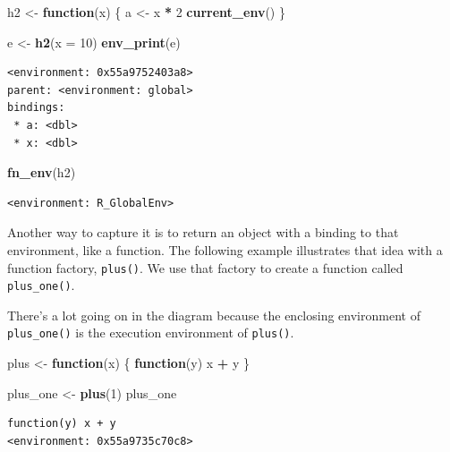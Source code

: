 \documentclass[]{book}
\newenvironment{Shaded}{\begin{snugshade}}{\end{snugshade}}
\newcommand{\ControlFlowTok}[1]{\textcolor[rgb]{0.13,0.29,0.53}{\textbf{#1}}}
\newcommand{\DataTypeTok}[1]{\textcolor[rgb]{0.13,0.29,0.53}{#1}}
\newcommand{\DecValTok}[1]{\textcolor[rgb]{0.00,0.00,0.81}{#1}}
\newcommand{\KeywordTok}[1]{\textcolor[rgb]{0.13,0.29,0.53}{\textbf{#1}}}
\newcommand{\NormalTok}[1]{#1}
\newcommand{\OperatorTok}[1]{\textcolor[rgb]{0.81,0.36,0.00}{\textbf{#1}}}
\newcommand{\StringTok}[1]{\textcolor[rgb]{0.31,0.60,0.02}{#1}}
\theoremstyle{definition}
\theoremstyle{definition}
\theoremstyle{definition}
\theoremstyle{remark}
\begin{document}
\begin{Shaded}
\begin{Highlighting}[]
\NormalTok{h2 <-}\StringTok{ }\ControlFlowTok{function}\NormalTok{(x) \{}
\NormalTok{  a <-}\StringTok{ }\NormalTok{x }\OperatorTok{*}\StringTok{ }\DecValTok{2}
  \KeywordTok{current_env}\NormalTok{()}
\NormalTok{\}}

\NormalTok{e <-}\StringTok{ }\KeywordTok{h2}\NormalTok{(}\DataTypeTok{x =} \DecValTok{10}\NormalTok{)}
\KeywordTok{env_print}\NormalTok{(e)}
\end{Highlighting}
\end{Shaded}

\begin{verbatim}
<environment: 0x55a9752403a8>
parent: <environment: global>
bindings:
 * a: <dbl>
 * x: <dbl>
\end{verbatim}

\begin{Shaded}
\begin{Highlighting}[]
\KeywordTok{fn_env}\NormalTok{(h2)}
\end{Highlighting}
\end{Shaded}

\begin{verbatim}
<environment: R_GlobalEnv>
\end{verbatim}

Another way to capture it is to return an object with a binding to that
environment, like a function. The following example illustrates that
idea with a function factory, \texttt{plus()}. We use that factory to
create a function called \texttt{plus\_one()}.

There's a lot going on in the diagram because the enclosing environment
of \texttt{plus\_one()} is the execution environment of \texttt{plus()}.

\begin{Shaded}
\begin{Highlighting}[]
\NormalTok{plus <-}\StringTok{ }\ControlFlowTok{function}\NormalTok{(x) \{}
  \ControlFlowTok{function}\NormalTok{(y) x }\OperatorTok{+}\StringTok{ }\NormalTok{y}
\NormalTok{\}}

\NormalTok{plus_one <-}\StringTok{ }\KeywordTok{plus}\NormalTok{(}\DecValTok{1}\NormalTok{)}
\NormalTok{plus_one}
\end{Highlighting}
\end{Shaded}

\begin{verbatim}
function(y) x + y
<environment: 0x55a9735c70c8>
\end{verbatim}
\end{document}
